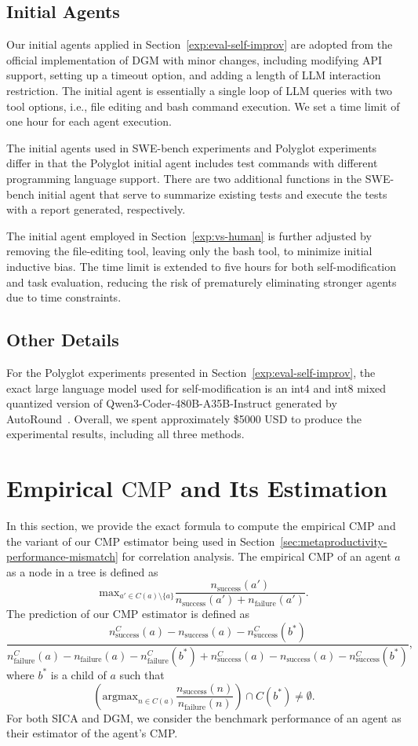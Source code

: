 \documentclass{article} %
\begin{document}
\subsection{Initial Agents}
\label{app:exp}
Our initial agents applied in Section~\ref{exp:eval-self-improv} are adopted from the official implementation of DGM with minor changes, including modifying API support, setting up a timeout option, and adding a length of LLM interaction restriction. The initial agent is essentially a single loop of LLM queries with two tool options, i.e., file editing and bash command execution. We set a time limit of one hour for each agent execution.

The initial agents used in SWE-bench experiments and Polyglot experiments differ in that the Polyglot initial agent includes test commands with different programming language support. There are two additional functions in the SWE-bench initial agent that serve to summarize existing tests and execute the tests with a report generated, respectively.

The initial agent employed in Section~\ref{exp:vs-human} is further adjusted by removing the file-editing tool, leaving only the bash tool, to minimize initial inductive bias. The time limit is extended to five hours for both self-modification and task evaluation, reducing the risk of prematurely eliminating stronger agents due to time constraints.
\subsection{Other Details}
For the Polyglot experiments presented in Section~\ref{exp:eval-self-improv}, the exact large language model used for self-modification is an int4 and int8 mixed quantized version of Qwen3-Coder-480B-A35B-Instruct generated by AutoRound~\citep{intel_autoround}. 
Overall, we spent approximately \$5000 USD to produce the experimental results, including all three methods.

\newpage
\section{Empirical $\mathrm{CMP}$ and Its Estimation}\label{app:cmp_estimation}
In this section, we provide the exact formula to compute the empirical $\mathrm{CMP}$ and the variant of our $\mathrm{CMP}$ estimator being used in Section~\ref{sec:metaproductivity-performance-mismatch} for correlation analysis. The empirical $\mathrm{CMP}$ of an agent $a$ as a node in a tree is defined as 
\[
\text{max}_{a'\in C(a)\setminus \{a\}} \frac{n_\text{success}(a')}{n_\text{success}(a') + n_\text{failure}(a')}.
\]
The prediction of our $\mathrm{CMP}$ estimator is defined as
\[
\frac{n_\text{success}^C(a) - n_\text{success}(a) - n_\text{success}^C(b^*)}{n_\text{failure}^C(a) - n_\text{failure}(a) - n_\text{failure}^C(b^*) + n_\text{success}^C(a) - n_\text{success}(a) - n_\text{success}^C(b^*)},
\]
where $b^*$ is a child of $a$ such that
\[
\left( \text{argmax}_{n \in C(a)} \frac{n_\text{success}(n)}{n_\text{failure}(n)}\right) \cap {C(b^*)} \neq \emptyset.
\]
For both SICA and DGM, we consider the benchmark performance of an agent as their estimator of the agent's CMP.
\end{document}
